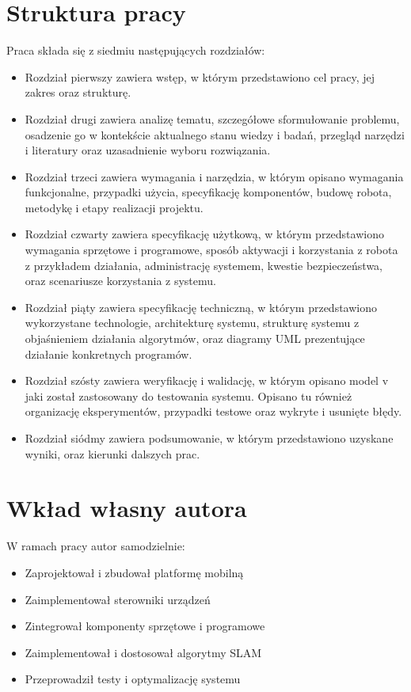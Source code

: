 \documentclass[a4paper,twoside,12pt]{book}
\begin{document}
\section{Struktura pracy}
Praca składa się z siedmiu następujących rozdziałów:
\begin{itemize}
\item Rozdział pierwszy zawiera wstęp, w którym przedstawiono cel pracy, jej zakres oraz strukturę.
\item Rozdział drugi zawiera analizę tematu, szczegółowe sformułowanie problemu, osadzenie go w kontekście aktualnego stanu wiedzy i badań, przegląd narzędzi i literatury oraz uzasadnienie wyboru rozwiązania.
\item Rozdział trzeci zawiera wymagania i narzędzia, w którym opisano wymagania funkcjonalne, przypadki użycia, specyfikację komponentów, budowę robota, metodykę i etapy realizacji projektu.
\item Rozdział czwarty zawiera specyfikację użytkową, w którym przedstawiono wymagania sprzętowe i programowe, sposób aktywacji i korzystania z robota z przykładem działania, administrację systemem, kwestie bezpieczeństwa, oraz scenariusze korzystania z systemu.
\item Rozdział piąty zawiera specyfikację techniczną, w którym przedstawiono wykorzystane technologie, architekturę systemu, strukturę systemu z objaśnieniem działania algorytmów, oraz diagramy UML prezentujące działanie konkretnych programów.
\item Rozdział szósty zawiera weryfikację i walidację, w którym opisano model v jaki został zastosowany do testowania systemu. Opisano tu również organizację eksperymentów, przypadki testowe oraz wykryte i usunięte błędy.
\item Rozdział siódmy zawiera podsumowanie, w którym przedstawiono uzyskane wyniki, oraz kierunki dalszych prac.
\end{itemize}

\section{Wkład własny autora}
W ramach pracy autor samodzielnie:
\begin{itemize}
\item Zaprojektował i zbudował platformę mobilną
\item Zaimplementował sterowniki urządzeń
\item Zintegrował komponenty sprzętowe i programowe
\item Zaimplementował i dostosował algorytmy SLAM
\item Przeprowadził testy i optymalizację systemu
\end{itemize}
\end{document}

